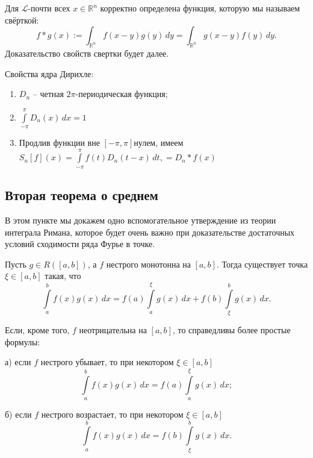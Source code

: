 \begin{definition}
    Для $\mathcal{L}\text{-почти всех } x \in \mathbb{R}^n$ корректно определена функция, которую мы называем свёрткой:
\[
f * g(x) := \int_{\mathbb{R}^n} f(x - y) g(y) \, dy = \int_{\mathbb{R}^n} g(x - y) f(y) \, dy.
\]
Доказательство свойств свертки  будет далее.
\end{definition}

\begin{note}
    Свойства ядра Дирихле:
\begin{enumerate}
    \item $D_{n}$ -- четная $2\pi$-периодическая функция;
    \item $\int\limits_{-\pi}^{\pi}D_{n}(x)\,dx=1$
    \item Продлив функции вне $[-\pi, \pi]$нулем, имеем $S_n[f](x) = \int\limits_{-\pi}^{\pi} f(t) D_n(t - x)\,dt, = D_n*f(x)$
\end{enumerate}
\end{note}




\subsection{Вторая теорема о среднем}

В этом пункте мы докажем одно вспомогательное утверждение из теории интеграла Римана, которое 
будет очень важно при доказательстве достаточных условий сходимости ряда Фурье в точке.

\begin{theorem}
\label{Th.average}
Пусть $g \in R([a,b])$, а $f$ нестрого монотонна на $[a,b]$. Тогда существует точка $\xi \in [a,b]$ такая, что
\begin{equation}
\label{eqq.average_1}
\int\limits_{a}^{b}f(x)g(x)\,dx = f(a)\int\limits_{a}^{\xi}g(x)\,dx + f(b)\int\limits_{\xi}^{b}g(x)\,dx.
 \end{equation}

Если, кроме того, $f$ неотрицательна на $[a,b]$, то справедливы более простые формулы:

а) если $f$ нестрого убывает, то при некотором $\xi \in [a,b]$
\begin{equation}
\label{eqq.average_2}
\int\limits_{a}^{b}f(x)g(x)\,dx = f(a)\int\limits_{a}^{\xi}g(x)\,dx;
\end{equation}
 
б) если $f$ нестрого возрастает, то при некотором $\xi \in [a,b]$
\begin{equation}
\label{eqq.average_3}
\int\limits_{a}^{b}f(x)g(x)\,dx = f(b)\int\limits_{\xi}^{b}g(x)\,dx.
\end{equation}

\end{theorem}

